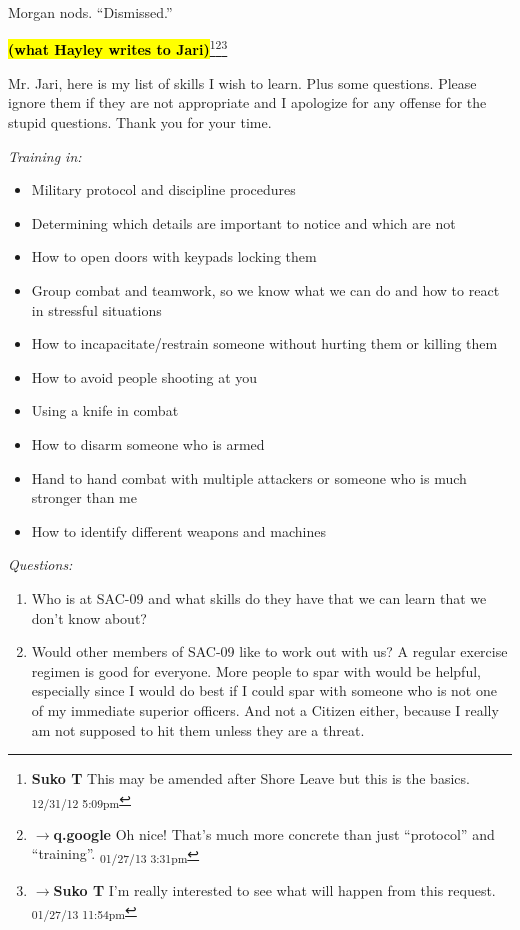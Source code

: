 Morgan nods. ``Dismissed.''


\textbf{\hl{(what Hayley writes to Jari)}}\footnote{\textbf{Suko T }This may be amended after Shore Leave but this is the basics. \textsubscript{12/31/12 5:09pm}}\footnote{$\rightarrow$\textbf{q.google }Oh nice!  That's much more concrete than just ``protocol'' and ``training''. \textsubscript{01/27/13 3:31pm}}\footnote{$\rightarrow$\textbf{Suko T }I'm really interested to see what will happen from this request. \textsubscript{01/27/13 11:54pm}}

Mr. Jari, here is my list of skills I wish to learn.  Plus some questions.  Please ignore them if they are not appropriate and I apologize for any offense for the stupid questions.  Thank you for your time.



\textit{Training in:}

\begin{itemize}
\item Military protocol and discipline procedures
\item Determining which details are important to notice and which are not
\item How to open doors with keypads locking them
\item Group combat and teamwork, so we know what we can do and how to react in stressful situations
\item How to incapacitate/restrain someone without hurting them or killing them
\item How to avoid people shooting at you
\item Using a knife in combat
\item How to disarm someone who is armed
\item Hand to hand combat with multiple attackers or someone who is much stronger than me
\item How to identify different weapons and machines
\end{itemize}



\textit{Questions:}

\begin{enumerate}
\item Who is at SAC-09 and what skills do they have that we can learn that we don't know about?
\item Would other members of SAC-09 like to work out with us?  A regular exercise regimen is good for everyone.  More people to spar with would be helpful, especially since I would do best if I could spar with someone who is not one of my immediate superior officers.  And not a Citizen either, because I really am not supposed to hit them unless they are a threat. 
\end{enumerate}



